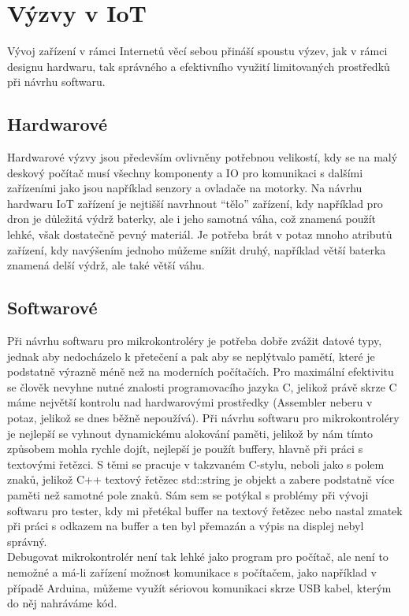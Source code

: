 
\section{Výzvy v IoT}
Vývoj zařízení v rámci Internetů věcí sebou přináší spoustu výzev, jak v rámci designu hardwaru, tak správného a efektivního využití limitovaných prostředků při návrhu softwaru. 

\subsection{Hardwarové}
Hardwarové výzvy jsou především ovlivněny potřebnou velikostí, kdy se na malý deskový počítač musí všechny komponenty a IO pro komunikaci s dalšími zařízeními jako jsou například senzory a ovladače na motorky. Na návrhu hardwaru IoT zařízení je nejtišší navrhnout “tělo” zařízení, kdy například pro dron je důležitá výdrž baterky, ale i jeho samotná váha, což znamená použít lehké, však dostatečně pevný materiál. Je potřeba brát v potaz mnoho atributů zařízení, kdy navýšením jednoho můžeme snížit druhý, například větší baterka znamená delší výdrž, ale také větší váhu.

\subsection{Softwarové}
Při návrhu softwaru pro mikrokontroléry je potřeba dobře zvážit datové typy, jednak aby nedocházelo k přetečení a pak aby se neplýtvalo pamětí, které je podstatně výrazně méně než na moderních počítačích. Pro maximální efektivitu se člověk nevyhne nutné znalosti programovacího jazyka C, jelikož právě skrze C máme největší kontrolu nad hardwarovými prostředky (Assembler neberu v potaz, jelikož se dnes běžně nepoužívá). Při návrhu softwaru pro mikrokontroléry je nejlepší se vyhnout dynamickému alokování paměti, jelikož by nám tímto způsobem mohla rychle dojít, nejlepší je použít buffery, hlavně při práci s textovými řetězci. S těmi se pracuje v takzvaném C-stylu, neboli jako s polem znaků, jelikož C++ textový řetězec std::string je objekt a zabere podstatně více paměti než samotné pole znaků. Sám sem se potýkal s problémy při vývoji softwaru pro tester, kdy mi přetékal buffer na textový řetězec nebo nastal zmatek při práci s odkazem na buffer a ten byl přemazán a výpis na displej nebyl správný.\\
Debugovat mikrokontrolér není tak lehké jako program pro počítač, ale není to nemožné a má-li zařízení možnost komunikace s počítačem, jako například v případě Arduina, můžeme využít sériovou komunikaci skrze USB kabel, kterým do něj nahráváme kód. 
